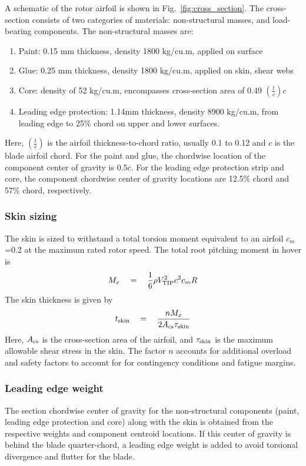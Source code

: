 A schematic of the rotor airfoil is shown in Fig.~\ref{fig:cross_section}. The cross-section consists of two categories of materials: non-structural masses, and load-bearing components. The non-structural masses are:
\begin{enumerate}
\item Paint: 0.15 mm thickness, density 1800 kg/cu.m, applied on surface
\item Glue: 0.25 mm thickness, density 1800 kg/cu.m, applied on skin, shear webs
\item Core: density of 52 kg/cu.m, encompasses cross-section area of 0.49 $\left(\frac{t}{c}\right) c$
\item Leading edge protection: 1.14mm thickness, density 8900 kg/cu.m, from leading edge to 25\% chord on upper and lower surfaces.
\end{enumerate}
Here, $\left(\frac{t}{c}\right)$ is the airfoil thickness-to-chord ratio, usually 0.1 to 0.12 and $c$ is the blade airfoil chord. For the paint and glue, the chordwise location of the component center of gravity is 0.5$c$. For the leading edge protection strip and core, the component chordwise center of gravity locations are 12.5\% chord and 57\% chord, respectively. 

\subsubsection{Skin sizing}
The skin is sized to withstand a total torsion moment equivalent to an airfoil $c_m$=0.2 at the maximum rated rotor speed. The total root pitching moment in hover is 
\begin{equation*}
M_x \quad = \quad \frac{1}{6} \rho V_{\rm TIP}^2 c^2 c_m R 
\end{equation*}
The skin thickness is given by 
\begin{equation*}
t_{\rm skin} \quad = \quad \frac{n M_x}{2 A_{\rm cs} \tau_{\rm skin}}
\end{equation*}
Here, $A_{\rm cs}$ is the cross-section area of the airfoil, and $\tau_{\rm skin}$ is the maximum allowable shear stress in the skin. The factor $n$ accounts for additional overload and safety factors to account for for contingency conditions and fatigue margins. 

\subsubsection{Leading edge weight}
The section chordwise center of gravity for the non-structural components (paint, leading edge protection and core) along with the skin is obtained from the respective weights and component centroid locations. If this center of gravity is behind the blade quarter-chord, a leading edge weight is added to avoid torsional divergence  and flutter for the blade.

